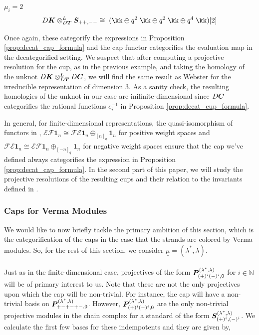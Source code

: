 \documentclass{article}
\begin{document}
\begin{ex}{$\mu_i=2$}
    $$ D\Kb \otimes^L_{D\Tb} \Sb_{++,--} \cong \hspace{1mm}( \kk  \oplus q^2 \hspace{1mm} \kk \oplus  q^2 \hspace{1mm}  \kk \oplus  q^4 \hspace{1mm} \kk)[2]$$

Once again, these categorify the expressions in Proposition \ref{prop:decat_cap_formula} and the cap functor categorifies the evaluation map in the decategorified setting. We suspect that after computing a projective resolution for the cup, as in the previous example, and taking the homology of the unknot $D{\boldsymbol{K}} \otimes^L_{D{\boldsymbol{T}} }D{\boldsymbol{C}}$, we will find the same result as Webster \cite{Web} for the irreducible representation of dimension $3$. As a sanity check, the resulting homologies of the unknot in our case are inifinite-dimensional since $D{\boldsymbol{C}}$ categorifies the rational functions $e_i^{-1}$ in Proposition \ref{prop:decat_cup_formula}. 
\end{ex}

In general, for finite-dimensional representations, the quasi-isomorphism of functors in \cite{Lau}, $\mathcal{E}\mathcal{F}\boldsymbol{1}_n \cong \mathcal{F} \mathcal{E}\boldsymbol{1}_n\oplus_{[n]_q}\boldsymbol{1}_n$ for positive weight spaces and $\mathcal{F}\mathcal{E}\boldsymbol{1}_n \cong \mathcal{E} \mathcal{F}\boldsymbol{1}_n\oplus_{[-n]_q}\boldsymbol{1}_n$ for negative weight spaces ensure that the cap we've defined always categorifies the expression in Proposition \ref{prop:decat_cap_formula}. In the second part of this paper, we will study the projective resolutions of the resulting cups and their relation to the invariants defined in \cite{Web}. 

\subsubsection{Caps for Verma Modules}
We would like to now briefly tackle the primary ambition of this section, which is the categorification of the caps in the case that the strands are colored by Verma modules. So, for the rest of this section, we consider $\underline{\mu} = (\lambda^*,\lambda)$. \\ \\ 
Just as in the finite-dimensional case, projectives of the form ${\boldsymbol{P}}^{(\lambda^*,\lambda)}_{(+)^i(-)^i,0}$ for $i\in \mathbb{N}$ will be of primary interest to us. Note that these are not the only projectives upon which the cap will be non-trivial. For instance, the cap will have a non-trivial basis on ${\boldsymbol{P}}^{(\lambda^*,\lambda)}_{+-+-+-,0}$. However, ${\boldsymbol{P}}^{(\lambda^*,\lambda)}_{(+)^i(-)^i,0}$ are the only non-trivial projective modules in the chain complex for a standard of the form ${\boldsymbol{S}}^{(\lambda^*,\lambda)}_{(+)^i,(-)^i}$. We calculate the first few bases for these indempotents and they are given by, 
\end{document}
